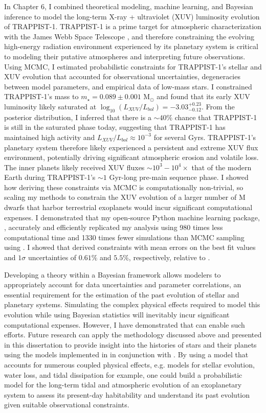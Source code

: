 In Chapter 6, I combined theoretical modeling, machine learning, and Bayesian inference to model the long-term X-ray + ultraviolet (XUV) luminosity evolution of TRAPPIST-1. TRAPPIST-1 is a prime target for atmospheric characterization with the James Webb Space Telescope \citep{Morley2017,Lincowski2018,Lustig2019}, and therefore constraining the evolving high-energy radiation environment experienced by its planetary system is critical to modeling their putative atmospheres and interpreting future observations. Using MCMC, I estimated probabilistic constraints for TRAPPIST-1's stellar and XUV evolution that accounted for observational uncertainties, degeneracies between model parameters, and empirical data of low-mass stars. I constrained TRAPPIST-1's mass to $m_{\star} = 0.089 \pm{0.001}$ M$_{\odot}$ and found that its early XUV luminosity likely saturated at $\log_{10}(L_{XUV}/L_{bol}) = -3.03^{+0.23}_{-0.12}$. From the posterior distribution, I inferred that there is a ${\sim}40\%$ chance that TRAPPIST-1 is still in the saturated phase today, suggesting that TRAPPIST-1 has maintained high activity and $L_{XUV}/L_{bol} \approx 10^{-3}$ for several Gyrs. TRAPPIST-1's planetary system therefore likely experienced a persistent and extreme XUV flux environment, potentially driving significant atmospheric erosion and volatile loss. The inner planets likely received XUV fluxes ${\sim}10^3 - 10^4\times$ that of the modern Earth during TRAPPIST-1's ${\sim}1$ Gyr-long pre-main sequence phase. I showed how deriving these constraints via MCMC is computationally non-trivial, so scaling my methods to constrain the XUV evolution of a larger number of M dwarfs that harbor terrestrial exoplanets would incur significant computational expenses. I demonstrated that my open-source Python machine learning package, \approxposterior, accurately and efficiently replicated my analysis using 980 times less computational time and 1330 times fewer simulations than MCMC sampling using \emcee. I showed that \approxposterior derived constraints with mean errors on the best fit values and $1\sigma$ uncertainties of $0.61\%$ and $5.5\%$, respectively, relative to \emcee.

Developing a theory within a Bayesian framework allows modelers to appropriately account for data uncertainties and parameter correlations, an essential requirement for the estimation of the past evolution of stellar and planetary systems. Simulating the complex physical effects required to model this evolution while using Bayesian statistics will inevitably incur significant computational expenses. However, I have demonstrated that \approxposterior can enable such efforts. Future research can apply the methodology discussed above and presented in this dissertation to provide insight into the histories of stars and their planets using the models implemented in \vplanet in conjunction with \approxposterior. By using a model that accounts for numerous coupled physical effects, e.g. models for stellar evolution, water loss, and tidal dissipation for example, one could build a probabilistic model for the long-term tidal and atmospheric evolution of an exoplanetary system to assess its present-day habitability and understand its past evolution given suitable observational constraints. 

